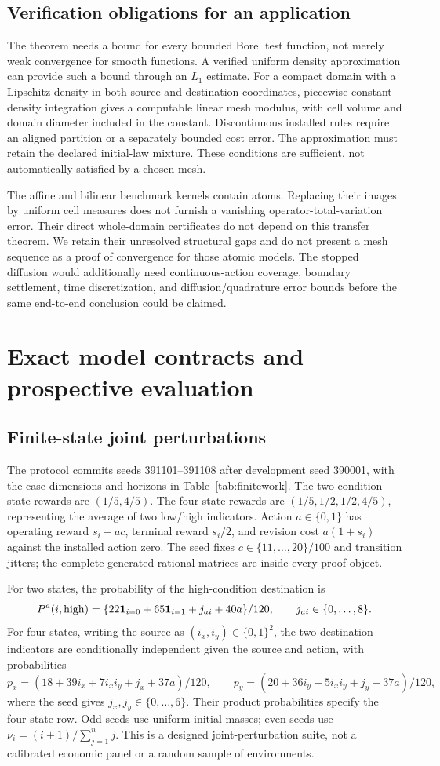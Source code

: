 \subsection{Verification obligations for an application}
The theorem needs a bound for every bounded Borel test function, not merely weak convergence for smooth functions. A verified uniform density approximation can provide such a bound through an $L_1$ estimate. For a compact domain with a Lipschitz density in both source and destination coordinates, piecewise-constant density integration gives a computable linear mesh modulus, with cell volume and domain diameter included in the constant. Discontinuous installed rules require an aligned partition or a separately bounded cost error. The approximation must retain the declared initial-law mixture. These conditions are sufficient, not automatically satisfied by a chosen mesh.

The affine and bilinear benchmark kernels contain atoms. Replacing their images by uniform cell measures does not furnish a vanishing operator-total-variation error. Their direct whole-domain certificates do not depend on this transfer theorem. We retain their unresolved structural gaps and do not present a mesh sequence as a proof of convergence for those atomic models. The stopped diffusion would additionally need continuous-action coverage, boundary settlement, time discretization, and diffusion/quadrature error bounds before the same end-to-end conclusion could be claimed.

\section{Exact model contracts and prospective evaluation}
\subsection{Finite-state joint perturbations}
The protocol commits seeds 391101--391108 after development seed 390001, with the case dimensions and horizons in Table~\ref{tab:finitework}. The two-condition state rewards are $(1/5,4/5)$. The four-state rewards are $(1/5,1/2,1/2,4/5)$, representing the average of two low/high indicators. Action $a\in\{0,1\}$ has operating reward $s_i-a c$, terminal reward $s_i/2$, and revision cost $a(1+s_i)$ against the installed action zero. The seed fixes $c\in\{11,\ldots,20\}/100$ and transition jitters; the complete generated rational matrices are inside every proof object.

For two states, the probability of the high-condition destination is
\[
 P^a(i,\mathrm{high})=
 \{22\mathbf 1_{i=0}+65\mathbf 1_{i=1}+j_{ai}+40a\}/120,
 \qquad j_{ai}\in\{0,\ldots,8\}.
\]
For four states, writing the source as $(i_x,i_y)\in\{0,1\}^2$, the two destination indicators are conditionally independent given the source and action, with probabilities
\[
 p_x=(18+39i_x+7i_xi_y+j_x+37a)/120,\qquad
 p_y=(20+36i_y+5i_xi_y+j_y+37a)/120,
\]
where the seed gives $j_x,j_y\in\{0,\ldots,6\}$. Their product probabilities specify the four-state row. Odd seeds use uniform initial masses; even seeds use $\nu_i=(i+1)/\sum_{j=1}^n j$. This is a designed joint-perturbation suite, not a calibrated economic panel or a random sample of environments.

